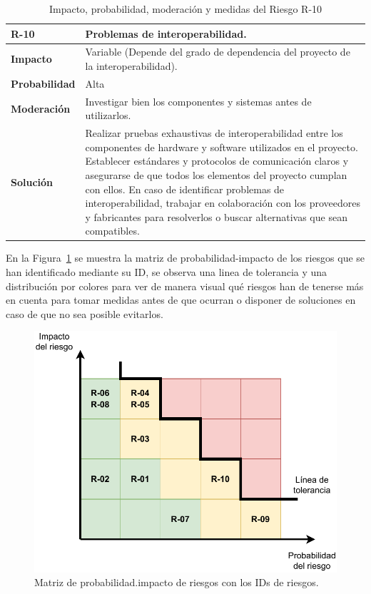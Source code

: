\begin{table}[htbp]
\begin{center}
\begin{tabular}{|l|p{12cm}|}
\hline
\textbf{R-10} & Problemas de interoperabilidad. \\ \hline
\textbf{Impacto} & Variable (Depende del grado de dependencia del proyecto de la interoperabilidad). \\ \hline
\textbf{Probabilidad} & Alta \\ \hline
\textbf{Moderación} & Investigar bien los componentes y sistemas antes de utilizarlos.\\ \hline
\textbf{Solución} & Realizar pruebas exhaustivas de interoperabilidad entre los componentes de hardware y software utilizados en el proyecto. Establecer estándares y protocolos de comunicación claros y asegurarse de que todos los elementos del proyecto cumplan con ellos. En caso de identificar problemas de interoperabilidad, trabajar en colaboración con los proveedores y fabricantes para resolverlos o buscar alternativas que sean compatibles.\\ \hline
\end{tabular}
\caption[Riesgo R-10]{Impacto, probabilidad, moderación y medidas del Riesgo R-10}
\label{tabla:r-10}
\end{center}
\end{table}

\clearpage
En la Figura~\ref{fig:matrizRiesgos} se muestra la matriz de probabilidad-impacto de los riesgos que se han identificado mediante su ID, se observa una linea de tolerancia y una distribución por colores para ver de manera visual qué riesgos han de tenerse más en cuenta para tomar medidas antes de que ocurran o disponer de soluciones en caso de que no sea posible evitarlos.

\begin{figure}[h]
\centering
\includegraphics{images/matrizImpacto.pdf}
\caption[Matriz de impacto de riesgos]{Matriz de probabilidad.impacto de riesgos con los IDs de riesgos.}%
\label{fig:matrizRiesgos}
\end{figure}

